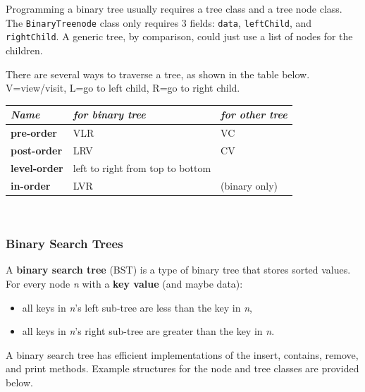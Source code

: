 Programming a binary tree usually requires a tree class and a tree node class. The \texttt{BinaryTreenode} class only requires 3 fields: \texttt{data}, \texttt{leftChild}, and \texttt{rightChild}. A generic tree, by comparison, could just use a list of nodes for the children. 

There are several ways to traverse a tree, as shown in the table below. V=view/visit, L=go to left child, R=go to right child. \\

\begin{tabular}{p{}p{}p{}}
\textit{Name} & \textit{for binary tree} & \textit{for other tree} \\
\hline
\textbf{pre-order} & VLR & VC \\
\textbf{post-order} & LRV & CV \\
\textbf{level-order} & left to right from top to bottom \\
\textbf{in-order} & LVR & (binary only) \\
\end{tabular} \\

\subsubsection{Binary Search Trees}

A \textbf{binary search tree} (BST) is a type of binary tree that stores sorted values. For every node \textit{n} with a \textbf{key value} (and maybe data):

\begin{itemize}
	\item all keys in \textit{n}'s left sub-tree are less than the key in \textit{n},
	\item all keys in \textit{n}'s right sub-tree are greater than the key in \textit{n}.
\end{itemize}

A binary search tree has efficient implementations of the insert, contains, remove, and print methods. Example structures for the node and tree classes are provided below. \\

